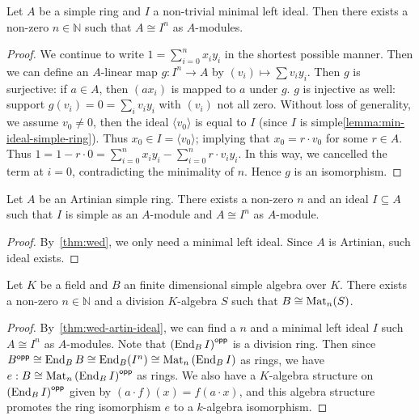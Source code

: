 \begin{theorem}[Wedderburn]\label{thm:wed}
  Let $A$ be a simple ring and $I$ a non-trivial minimal left ideal. Then there exists a non-zero $n \in \mathbb{N}$ such that $A \cong I^{n}$ as $A$-modules.
  \leanok
\end{theorem}

\begin{proof}
  We continue to write $1 = \sum_{i=0}^{n}x_{i}y_{i}$ in the shortest possible manner. Then we can define an $A$-linear map $g : I^{n}\to A$ by $(v_{i})\mapsto \sum v_{i}y_{i}$. Then $g$ is surjective: if $a \in A$, then $(ax_{i})$ is mapped to $a$ under $g$. $g$ is injective as well: support $g(v_{i})=0=\sum_{i}v_{i}y_{i}$ with $(v_{i})$ not all zero. Without loss of generality, we assume $v_{0} \ne 0$, then the ideal $\langle v_{0}\rangle$ is equal to $I$ (since $I$ is simple\cref{lemma:min-ideal-simple-ring}). Thus $x_{0}\in I = \langle v_{0}\rangle$; implying that $x_{0}=r\cdot v_{0}$ for some $r\in A$. Thus $1=1 - r\cdot 0 = \sum_{i=0}^{n}x_{i}y_{i}-\sum_{i=0}^{n}r\cdot v_{i}y_{i}$. In this way, we cancelled the term at $i=0$, contradicting the minimality of $n$. Hence $g$ is an isomorphism.
\end{proof}

\begin{theorem}
  Let $A$ be an Artinian simple ring. There exists a non-zero $n$ and an ideal $I \subseteq A$ such that $I$ is simple as an $A$-module and $A \cong I^{n}$ as $A$-module.
  \label{thm:wed-artin-ideal}
  \leanok
\end{theorem}

\begin{proof}
  By~\cref{thm:wed}, we only need a minimal left ideal. Since $A$ is Artinian, such ideal exists.
\end{proof}

\begin{theorem}
  Let $K$ be a field and $B$ an finite dimensional simple algebra over $K$. There exists a non-zero $n\in\mathbb{N}$ and a division $K$-algebra $S$ such that $B \cong \operatorname{Mat}_{n}(S)$.
  \leanok
\end{theorem}

\begin{proof}
  By~\cref{thm:wed-artin-ideal}, we can find a $n$ and a minimal left ideal $I$ such $A \cong I^{n}$ as $A$-modules. Note that ${\left(\operatorname{End}_{B}I\right)}^{\mathsf{opp}}$ is a division ring. Then since $B^{\mathsf{opp}}\cong\operatorname{End}_{B}B\cong{\operatorname{End}_{B}(I^{n})}\cong\operatorname{Mat}_{n}\left(\operatorname{End}_{B}I\right)$ as rings, we have $e : B\cong \operatorname{Mat}_{n}\left(\operatorname{End}_{B}I\right)^{\mathsf{opp}}$ as rings. We also have a $K$-algebra structure on ${\left(\operatorname{End}_{B} I\right)}^{\mathsf{opp}}$ given by $(a \cdot f)(x)=f(a\cdot x)$, and this algebra structure promotes the ring isomorphism $e$ to a $k$-algebra isomorphism.
\end{proof}

